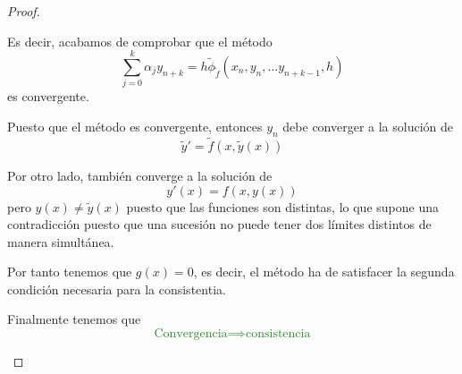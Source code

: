 \begin{proof}
\begin{itemize}
\begin{enumerate}
\begin{enumerate}
Es decir, acabamos de comprobar que el método 
\[\sum_{j=0}^kα_jy_{n+k} = h \tilde{\phi}_{\tilde{f}}(x_n,y_n,...y_{n+k-1},h)\]
es convergente.

Puesto que el método es convergente, entonces $y_n$ debe converger a la solución de 
\[\tilde{y}'=\tilde{f}(x,\tilde{y}(x))\]

Por otro lado, también converge a la solución de
\[y'(x)=f(x,y(x))\]
pero $y(x)\neq \tilde{y}(x)$ puesto que las funciones son distintas, lo que supone una contradicción puesto que una sucesión no puede tener dos límites distintos de manera simultánea.

Por tanto tenemos que $g(x)=0$, es decir, el método ha de satisfacer la segunda condición necesaria para la consistentia.
\end{enumerate}
Finalmente tenemos que
\textcolor{ForestGreen}{\[\text{Convergencia} \implies \text{consistencia}\]}
\end{enumerate}
\end{itemize}

\end{proof}
